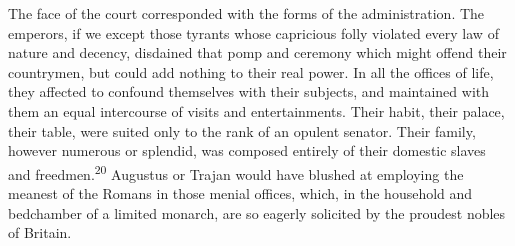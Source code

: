 
The face of the court corresponded with the forms of the
administration. The emperors, if we except those tyrants whose
capricious folly violated every law of nature and decency,
disdained that pomp and ceremony which might offend their
countrymen, but could add nothing to their real power. In all the
offices of life, they affected to confound themselves with their
subjects, and maintained with them an equal intercourse of visits
and entertainments. Their habit, their palace, their table, were
suited only to the rank of an opulent senator. Their family,
however numerous or splendid, was composed entirely of their
domestic slaves and freedmen.\textsuperscript{20} Augustus or Trajan would have
blushed at employing the meanest of the Romans in those menial
offices, which, in the household and bedchamber of a limited
monarch, are so eagerly solicited by the proudest nobles of
Britain.



